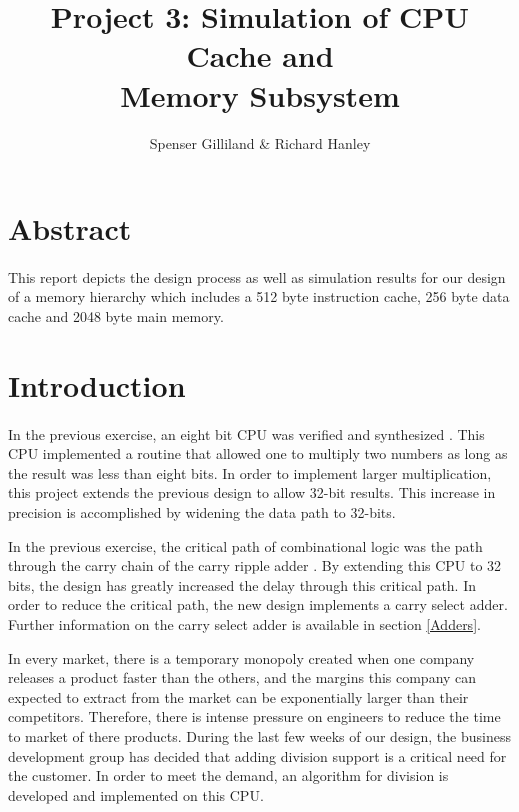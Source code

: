 \documentclass[11pt,letterpaper,final]{article}
\author{Spenser Gilliland \& Richard Hanley}
\title{Project 3: Simulation of CPU Cache and \\ Memory Subsystem}
\begin{document}
\maketitle
\bigskip
\bigskip
\bigskip

\section{ Abstract }
\paragraph{}
This report depicts the design process as well as simulation results for our design of a memory hierarchy which includes a 512 byte instruction cache, 256 byte data cache and 2048 byte main memory.  

\pagebreak
\section{ Introduction }
\paragraph{}
In the previous exercise, an eight bit CPU was verified and synthesized \cite{progress_report}.
This CPU implemented a routine that allowed one to multiply two
numbers as long as the result was less than eight bits.  In order to implement
larger multiplication, this project extends the previous design to allow 32-bit
results.  This increase in precision is accomplished by widening the data path to
32-bits. 

In the previous exercise, the critical path of combinational logic was the path
through the carry chain of the carry ripple adder \cite{progress_report}.  By extending this CPU to 32
bits, the design has greatly increased the delay through this critical path.  In
order to reduce the critical path, the new design implements a carry
select adder.  Further information on the carry select adder is available in
section \ref{Adders}.

In every market, there is a temporary monopoly created when one company
releases a product faster than the others, and the margins this
company can expected to extract from the market can be exponentially larger
than their competitors.  Therefore, there is intense pressure on engineers to
reduce the time to market of there products.  During the last few weeks of our
design, the business development group has decided that adding division support
is a critical need for the customer.  In order to meet the demand, an algorithm 
for division is developed and implemented on this CPU.
\end{document}
